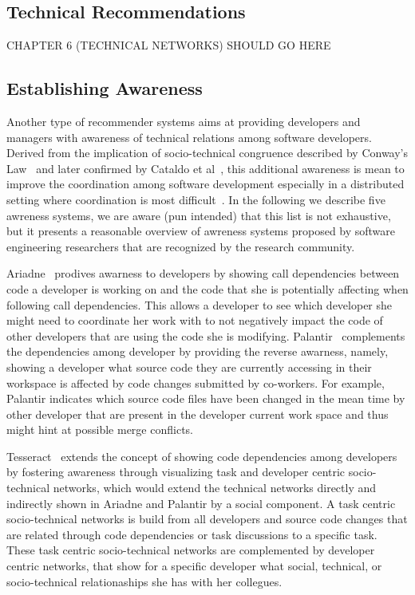 \subsection{Technical Recommendations}

CHAPTER 6 (TECHNICAL NETWORKS) SHOULD GO HERE

\subsection{Establishing Awareness}
Another type of recommender systems aims at providing developers and managers with awareness of technical relations among software developers.
Derived from the implication of socio-technical congruence described by Conway's Law~\cite{} and later confirmed by Cataldo et al~\cite{}, this additional awareness is mean to improve the coordination among software development especially in a distributed setting where coordination is most difficult~\cite{}.
In the following we describe five awreness systems, we are aware (pun intended) that this list is not exhaustive, but it presents a reasonable overview of awreness systems proposed by software engineering researchers that are recognized by the research community.

Ariadne~\cite{} prodives awarness to developers by showing call dependencies between code a developer is working on and the code that she is potentially affecting when following call dependencies.
This allows a developer to see which developer she might need to coordinate her work with to not negatively impact the code of other developers that are using the code she is modifying.
%
Palantir~\cite{} complements the dependencies among developer by providing the reverse awarness, namely, showing a developer what source code they are currently accessing in their workspace is affected by code changes submitted by co-workers.
For example, Palantir indicates which source code files have been changed in the mean time by other developer that are present in the developer current work space and thus might hint at possible merge conflicts.

Tesseract~\cite{} extends the concept of showing code dependencies among developers by fostering awareness through visualizing task and developer centric socio-technical networks, which would extend the technical networks directly and indirectly shown in Ariadne and Palantir by a social component.
A task centric socio-technical networks is build from all developers and source code changes that are related through code dependencies or task discussions to a specific task.
These task centric socio-technical networks are complemented by developer centric networks, that show for a specific developer what social, technical, or socio-technical relationaships she has with her collegues.

